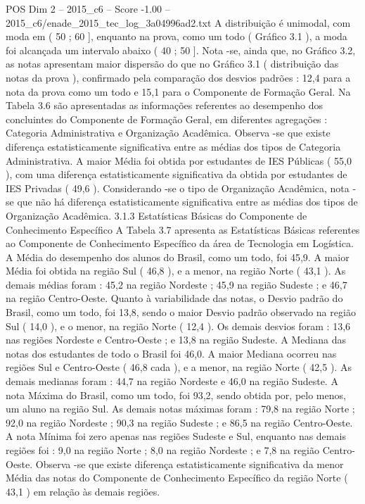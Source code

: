 \begin{textsample}{POS Dim 2 – 2015\_c6 – Score -1.00 – 2015\_c6/enade\_2015\_tec\_log\_3a04996ad2.txt}
A distribuição é unimodal, com moda em ( 50 ; 60 ], enquanto na prova, como um todo ( Gráfico 3.1 ), a moda foi alcançada um intervalo abaixo ( 40 ; 50 ].
Nota -se, ainda que, no Gráfico 3.2, as notas apresentam maior dispersão do que no Gráfico 3.1 ( distribuição das notas da prova ), confirmado pela comparação dos desvios padrões : 12,4 para a nota da prova como um todo e 15,1 para o Componente de Formação Geral.
Na Tabela 3.6 são apresentadas as informações referentes ao desempenho dos concluintes do Componente de Formação Geral, em diferentes agregações : Categoria Administrativa e Organização Acadêmica.
Observa -se que existe diferença estatisticamente significativa entre as médias dos tipos de Categoria Administrativa.
A maior Média foi obtida por estudantes de IES Públicas ( 55,0 ), com uma diferença estatisticamente significativa da obtida por estudantes de IES Privadas ( 49,6 ).
Considerando -se o tipo de Organização Acadêmica, nota -se que não há diferença estatisticamente significativa entre as médias dos tipos de Organização Acadêmica. 3.1.3 Estatísticas Básicas do Componente de Conhecimento Específico A Tabela 3.7 apresenta as Estatísticas Básicas referentes ao Componente de Conhecimento Específico da área de Tecnologia em Logística.
A Média do desempenho dos alunos do Brasil, como um todo, foi 45,9.
A maior Média foi obtida na região Sul ( 46,8 ), e a menor, na região Norte ( 43,1 ).
As demais médias foram : 45,2 na região Nordeste ; 45,9 na região Sudeste ; e 46,7 na região Centro-Oeste.
Quanto à variabilidade das notas, o Desvio padrão do Brasil, como um todo, foi 13,8, sendo o maior Desvio padrão observado na região Sul ( 14,0 ), e o menor, na região Norte ( 12,4 ).
Os demais desvios foram : 13,6 nas regiões Nordeste e Centro-Oeste ; e 13,8 na região Sudeste.
A Mediana das notas dos estudantes de todo o Brasil foi 46,0.
A maior Mediana ocorreu nas regiões Sul e Centro-Oeste ( 46,8 cada ), e a menor, na região Norte ( 42,5 ).
As demais medianas foram : 44,7 na região Nordeste e 46,0 na região Sudeste.
A nota Máxima do Brasil, como um todo, foi 93,2, sendo obtida por, pelo menos, um aluno na região Sul.
As demais notas máximas foram : 79,8 na região Norte ; 92,0 na região Nordeste ; 90,3 na região Sudeste ; e 86,5 na região Centro-Oeste.
A nota Mínima foi zero apenas nas regiões Sudeste e Sul, enquanto nas demais regiões foi : 9,0 na região Norte ; 8,0 na região Nordeste ; e 7,8 na região Centro-Oeste.
Observa -se que existe diferença estatisticamente significativa da menor Média das notas do Componente de Conhecimento Específico da região Norte ( 43,1 ) em relação às demais regiões.

\end{textsample}
